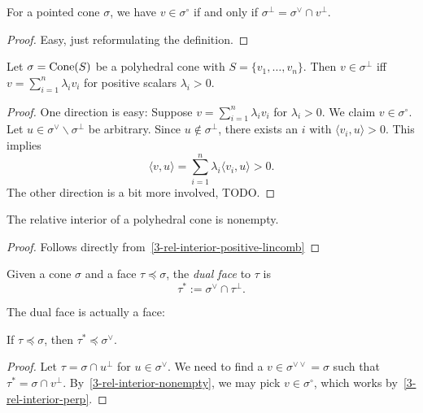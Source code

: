 \begin{lemma}
  \label{3-rel-interior-perp}
  \uses{}
  For a pointed cone \( \sigma \), we have \( v \in \sigma^{\circ} \)
  if and only if \( \sigma^{\perp} = \sigma^{\vee} \cap v^{\perp} \).
\end{lemma}
\begin{proof}
  \uses{}
  Easy, just reformulating the definition.
\end{proof}

\begin{lemma}
  \label{3-rel-interior-positive-lincomb}
  Let \( \sigma = \operatorname{Cone}(S) \) be a polyhedral cone with \( S = \{v_1,
  \dots, v_n\} \). Then \( v \in \sigma^{\perp} \) iff \( v =
  \sum_{i=1}^n \lambda_i v_i \) for positive scalars \( \lambda_i > 0
  \).
\end{lemma}
\begin{proof}
  \uses{}
  One direction is easy: Suppose \( v = \sum_{i=1}^n \lambda_i v_i \)
  for \( \lambda_i > 0 \). We claim \( v \in \sigma^{\circ} \). Let \(
  u \in \sigma^{\vee} \backslash \sigma^{\perp} \) be arbitrary. Since
  \( u \notin \sigma^{\perp} \), there exists an \( i \) with \(
  \langle v_i, u \rangle > 0 \). This implies
  \[
      \langle v, u \rangle = \sum_{i=1}^n \lambda_i \langle v_i, u
      \rangle > 0.
  \]
  The other direction is a bit more involved, TODO.
\end{proof}

\begin{lemma}
  \label{3-rel-interior-nonempty}
  \uses{}
  The relative interior of a polyhedral cone is nonempty.
\end{lemma}
\begin{proof}
  Follows directly from~\ref{3-rel-interior-positive-lincomb}
\end{proof}

\begin{definition}
  \label{3-dual-face}
  Given a cone \( \sigma \) and a face \( \tau \preceq \sigma \), the
  \emph{dual face} to \( \tau \) is
  \[
      \tau^* := \sigma^{\vee} \cap \tau^{\perp}.
  \]
\end{definition}

The dual face is actually a face:

\begin{proposition}
  \label{3-dual-face-face-dual}
  If \( \tau \preceq \sigma \), then \( \tau^* \preceq \sigma^\vee \).
\end{proposition}
\begin{proof}
  Let \( \tau = \sigma \cap u^{\perp} \) for \( u \in \sigma^{\vee}
  \). We need to find a \( v \in \sigma^{\vee\vee} = \sigma \) such
  that \( \tau^* = \sigma \cap v^{\perp} \).
  By~\ref{3-rel-interior-nonempty}, we may pick \( v \in
  \sigma^{\circ} \), which works by~\ref{3-rel-interior-perp}.
\end{proof}


